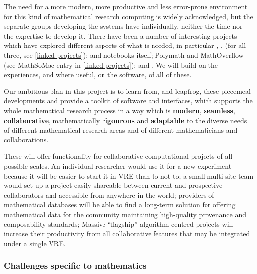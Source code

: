 The need for a more modern, more productive and less error-prone
environment for this kind of mathematical research computing is widely
acknowledged, but the separate groups developing the systems have
individually, neither the time nor the expertise to develop it. There
have been a number of interesting projects which have explored
different aspects of what is needed, in particular
\SMC, \HPCGAP, \scienceproject (for all three, see \ref{linked-projects});
\Sage and \Sage notebooks itself;
Polymath and MathOverflow (see MathSoMac entry in \ref{linked-projects});
and .
We will build on the experiences, and where useful, on the software, of all of these.

Our ambitious plan in this project is to learn from, and leapfrog,
these piecemeal developments and provide a toolkit of software and
interfaces, which supports the whole mathematical research process in
a way which is \textbf{modern}, \textbf{seamless},
\textbf{collaborative}, mathematically \textbf{rigourous} and
\textbf{adaptable} to the diverse needs of different mathematical
research areas and of different mathematicians and collaborations.


  
These will offer functionality for collaborative computational projects
of all possible scales. An individual researcher would use it for a new
experiment because it will be easier to start it in VRE than to not to;
a small multi-site team would set up a project easily shareable between
current and prospective collaborators and accessible from anywhere in the
world; providers of mathematical databases will be able to find a long-term
solution for offering mathematical data for the community maintaining
high-quality provenance and composability standards; Massive ``flagship''
algorithm-centred projects will increase their productivity from all
collaborative features that may be integrated under a single VRE.

\subsubsection{Challenges specific to  mathematics}

